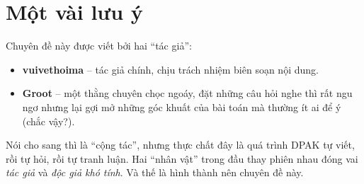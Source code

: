 \section{Một vài lưu ý}
Chuyên đề này được viết bởi hai ``tác giả'':

\begin{itemize}
    \item \textbf{vuivethoima} – tác giả chính, chịu trách nhiệm biên soạn nội dung.
    \item \textbf{Groot} – một thằng chuyên chọc ngoáy, đặt những câu hỏi nghe thì rất ngu ngơ nhưng lại gợi mở những góc khuất của bài toán mà thường ít ai để ý (chắc vậy?).
\end{itemize}

Nói cho sang thì là ``cộng tác'', nhưng thực chất đây là quá trình DPAK tự viết, rồi tự hỏi, rồi tự tranh luận. Hai ``nhân vật'' trong đầu thay phiên nhau đóng vai \textit{tác giả} và \textit{độc giả khó tính}. Và thế là hình thành nên chuyên đề này.
